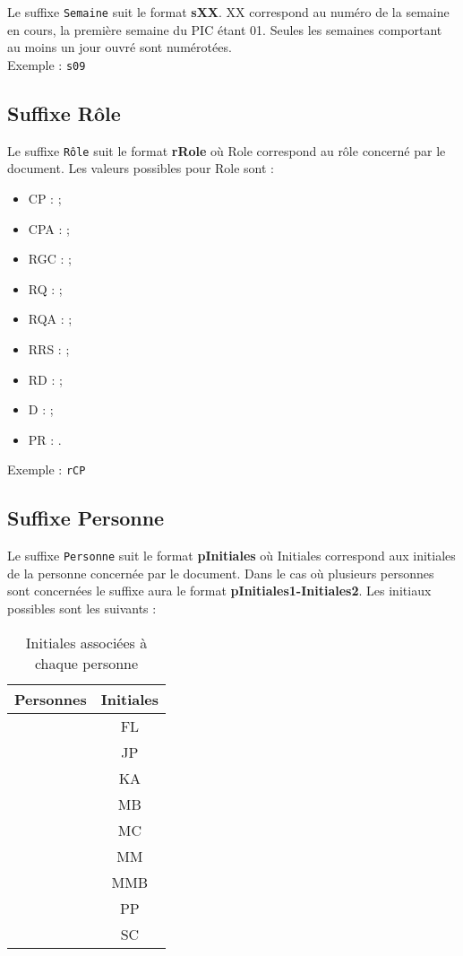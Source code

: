 Le suffixe \verb+Semaine+ suit le format \textbf{sXX}. XX correspond au numéro de la semaine en cours, la première semaine du PIC étant 01. Seules les semaines comportant au moins un jour ouvré sont numérotées.\\

Exemple : \verb+s09+

\subsection{Suffixe Rôle}
\label{suffixe_role}

Le suffixe \verb+Rôle+ suit le format \textbf{rRole} où Role correspond au rôle concerné par le document. Les valeurs possibles pour Role sont : 
\begin{itemize}
\item CP :  \CP;
\item CPA : \CPA;
\item RGC : \RGC;
\item RQ : \RQ;
\item RQA : \RQA;
\item RRS : \RRS;
\item RD : \RD;
\item D : \D;
\item PR : \PDR.\\
\end{itemize}

Exemple : \verb+rCP+

\subsection{Suffixe Personne}
\label{suffixe_personne}

Le suffixe \verb+Personne+ suit le format \textbf{pInitiales} où Initiales correspond aux initiales de la personne concernée par le document. Dans le cas où plusieurs personnes sont concernées le suffixe aura le format \textbf{pInitiales1-Initiales2}. Les initiaux possibles sont les suivants :
\begin{table}[H]
	\centering
	\begin{tabularx}{8cm}{|X|c|}
	\hline
	\rowcolor[gray]{0.85} Personnes & Initiales\\
	\hline
	\Florian & FL \\
	\hline
	\Julie & JP \\
	\hline
	\Kafui & KA \\
	\hline
	\Melissa & MB \\
	\hline
	\Michel & MC \\
	\hline
	\Mathieu & MM \\
	\hline
	\Matthieu & MMB \\
	\hline
	\Pierre & PP \\
	\hline
	\Sergi & SC \\
	\hline
	\end{tabularx}
	\caption{Initiales associées à chaque personne}
	\label{Initiales}
\end{table}

